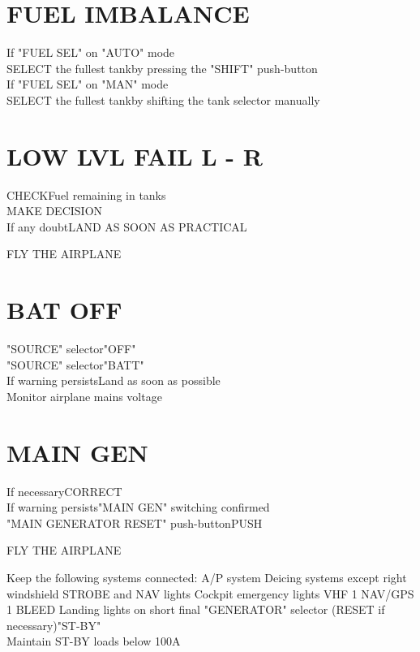 \documentclass{article}
\newcommand{\fly}{\vspace{-1em}\begin{center}\color{Green}FLY THE AIRPLANE\end{center}\vspace{-1em}}
\begin{document}
\begin{multicols*}{2}
\section*{\color{Orange}FUEL IMBALANCE}
If "FUEL SEL" on "AUTO" mode\\
\hspace*{6mm} SELECT the fullest tank\dotfill by pressing the "SHIFT" push-button\\
If "FUEL SEL" on "MAN" mode\\
\hspace*{6mm} SELECT the fullest tank\dotfill by shifting the tank selector manually
\section*{LOW LVL FAIL L - R}
CHECK\dotfill Fuel remaining in tanks\\
MAKE DECISION\\
If any doubt\dotfill LAND AS SOON AS PRACTICAL
\vspace{-1em}
\fly
\vspace{-1em}
\section*{\color{Orange}BAT OFF}
"SOURCE" selector\dotfill "OFF"\\
"SOURCE" selector\dotfill "BATT"\\
If warning persists\dotfill Land as soon as possible\\
Monitor airplane mains voltage
\section*{\color{Orange}MAIN GEN}
If necessary\dotfill CORRECT\\
If warning persists\dotfill "MAIN GEN" switching confirmed\\
"MAIN GENERATOR RESET" push-button\dotfill PUSH
\fly
Keep the following systems connected:
\hspace*{6mm} A/P system
\hspace*{6mm} Deicing systems except right windshield
\hspace*{6mm} STROBE and NAV lights
\hspace*{6mm} Cockpit emergency lights
\hspace*{6mm} VHF 1
\hspace*{6mm} NAV/GPS 1
\hspace*{6mm} BLEED
\hspace*{6mm} Landing lights on short final
"GENERATOR" selector (RESET if necessary)\dotfill "ST-BY"\\
Maintain ST-BY loads below 100A

\end{multicols*}
\end{document}
